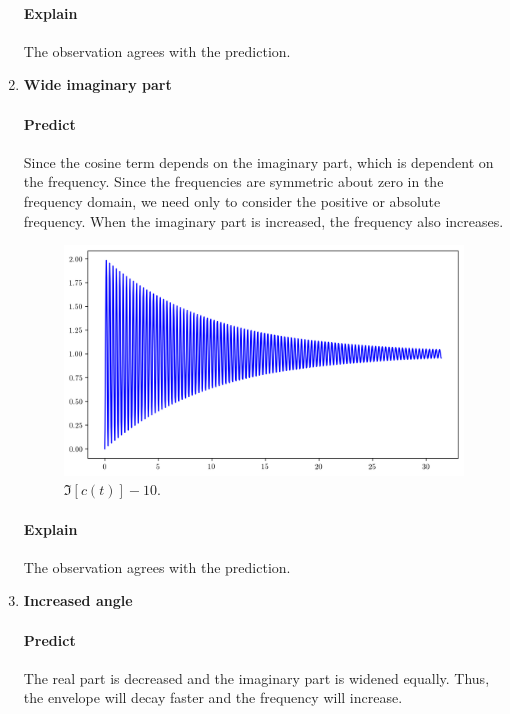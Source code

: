 \documentclass[12pt,a4paper,twoside]{article}
\begin{document}
\begin{enumerate}[(1)]
\paragraph{Explain} The observation agrees with the prediction.

\clearpage
\item \textbf{Wide imaginary part}

\paragraph{Predict} Since the cosine term depends on the imaginary part, which is dependent on the frequency. Since the frequencies are symmetric about zero in the frequency domain, we need only to consider the positive or absolute frequency. When the imaginary part is increased, the frequency also increases.

\begin{figure}[!h]
	\centering
	\includegraphics[width=\textwidth]{plusimag.png}
	\caption{$\Im[c(t)] - 10$.}
	\label{fig:plusimag}
\end{figure}

\paragraph{Explain} The observation agrees with the prediction.

\clearpage
\item \textbf{Increased angle}

\paragraph{Predict} The real part is decreased and the imaginary part is widened equally. Thus, the envelope will decay faster and the frequency will increase.


\end{enumerate}
\end{document}

